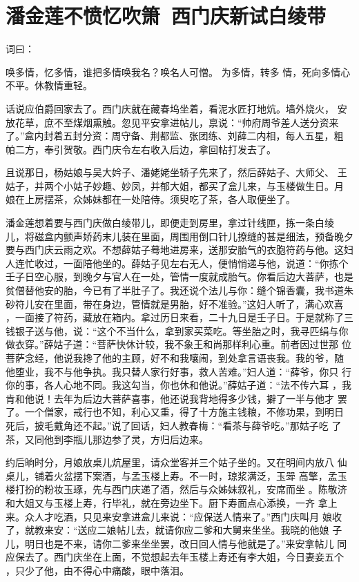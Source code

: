 \chapter{潘金莲不愤忆吹箫~西门庆新试白绫带}

词曰：

唤多情，忆多情，谁把多情唤我名？唤名人可憎。  为多情，转多
情，死向多情心不平。休教情重轻。

话说应伯爵回家去了。西门庆就在藏春坞坐着，看泥水匠打地炕。墙外烧火，
安放花草，庶不至煤烟熏触。忽见平安拿进帖儿，禀说：“帅府周爷差人送分资来
了。”盒内封着五封分资：周守备、荆都监、张团练、刘薛二内相，每人五星，粗
帕二方，奉引贺敬。西门庆令左右收入后边，拿回帖打发去了。

且说那日，杨姑娘与吴大妗子、潘姥姥坐轿子先来了，然后薛姑子、大师父、
王姑子，并两个小姑子妙趣、妙凤，并郁大姐，都买了盒儿来，与玉楼做生日。月
娘在上房摆茶，众姊妹都在一处陪侍。须臾吃了茶，各人取便坐了。

潘金莲想着要与西门庆做白绫带儿，即便走到房里，拿过针线匣，拣一条白绫
儿，将磁盒内颤声娇药末儿装在里面，周围用倒口针儿撩缝的甚是细法，预备晚夕
要与西门庆云雨之欢。不想薛姑子蓦地进房来，送那安胎气的衣胞符药与他。这妇
人连忙收过，一面陪他坐的。薛姑子见左右无人，便悄悄递与他，说道：“你拣个
壬子日空心服，到晚夕与官人在一处，管情一度就成胎气。你看后边大菩萨，也是
贫僧替他安的胎，今已有了半肚子了。我还说个法儿与你：缝个锦香囊，我书道朱
砂符儿安在里面，带在身边，管情就是男胎，好不准验。”这妇人听了，满心欢喜
，一面接了符药，藏放在箱内。拿过历日来看，二十九日是壬子日。于是就称了三
钱银子送与他，说：“这个不当什么，拿到家买菜吃。等坐胎之时，我寻匹绢与你
做衣穿。”薛姑子道：“菩萨快休计较，我不象王和尚那样利心重。前者因过世那
位菩萨念经，他说我搀了他的主顾，好不和我嚷闹，到处拿言语丧我。我的爷，随
他堕业，我不与他争执。我只替人家行好事，救人苦难。”妇人道：“薛爷，你只
行你的事，各人心地不同。我这勾当，你也休和他说。”薛姑子道：“法不传六耳
，我肯和他说！去年为后边大菩萨喜事，他还说我背地得多少钱，擗了一半与他才
罢了。一个僧家，戒行也不知，利心又重，得了十方施主钱粮，不修功果，到明日
死后，披毛戴角还不起。”说了回话，妇人教春梅：“看茶与薛爷吃。”那姑子吃
了茶，又同他到李瓶儿那边参了灵，方归后边来。

约后晌时分，月娘放桌儿炕屋里，请众堂客并三个姑子坐的。又在明间内放八
仙桌儿，铺着火盆摆下案酒，与孟玉楼上寿。不一时，琼浆满泛，玉斝
高擎，孟玉楼打扮的粉妆玉琢，先与西门庆递了酒，然后与众姊妹叙礼，安席而坐
。陈敬济和大姐又与玉楼上寿，行毕礼，就在旁边坐下。厨下寿面点心添换，一齐
拿上来。众人才吃酒，只见来安拿进盒儿来说：“应保送人情来了。”西门庆叫月
娘收了，就教来安：“送应二娘帖儿去，就请你应二爹和大舅来坐坐。我晓的他娘
子儿，明日也是不来，请你二爹来坐坐罢，改日回人情与他就是了。”来安拿帖儿
同应保去了。西门庆坐在上面，不觉想起去年玉楼上寿还有李大姐，今日妻妾五个
，只少了他，由不得心中痛酸，眼中落泪。

